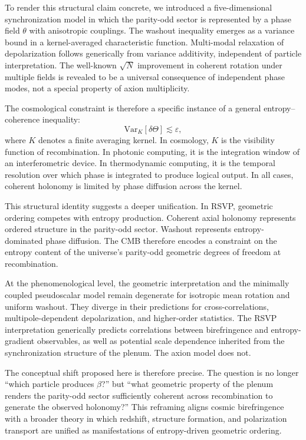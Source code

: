 \documentclass[12pt]{article}
\begin{document}
To render this structural claim concrete, we introduced a five-dimensional synchronization model in which the parity-odd sector is represented by a phase field $\theta$ with anisotropic couplings. The washout inequality emerges as a variance bound in a kernel-averaged characteristic function. Multi-modal relaxation of depolarization follows generically from variance additivity, independent of particle interpretation. The well-known $\sqrt{N}$ improvement in coherent rotation under multiple fields is revealed to be a universal consequence of independent phase modes, not a special property of axion multiplicity.

The cosmological constraint is therefore a specific instance of a general entropy--coherence inequality:
\begin{equation}
\mathrm{Var}_K[\delta\Theta] \lesssim \varepsilon,
\end{equation}
where $K$ denotes a finite averaging kernel. In cosmology, $K$ is the visibility function of recombination. In photonic computing, it is the integration window of an interferometric device. In thermodynamic computing, it is the temporal resolution over which phase is integrated to produce logical output. In all cases, coherent holonomy is limited by phase diffusion across the kernel.

This structural identity suggests a deeper unification. In RSVP, geometric ordering competes with entropy production. Coherent axial holonomy represents ordered structure in the parity-odd sector. Washout represents entropy-dominated phase diffusion. The CMB therefore encodes a constraint on the entropy content of the universe's parity-odd geometric degrees of freedom at recombination.

At the phenomenological level, the geometric interpretation and the minimally coupled pseudoscalar model remain degenerate for isotropic mean rotation and uniform washout. They diverge in their predictions for cross-correlations, multipole-dependent depolarization, and higher-order statistics. The RSVP interpretation generically predicts correlations between birefringence and entropy-gradient observables, as well as potential scale dependence inherited from the synchronization structure of the plenum. The axion model does not.

The conceptual shift proposed here is therefore precise. The question is no longer ``which particle produces $\beta$?'' but ``what geometric property of the plenum renders the parity-odd sector sufficiently coherent across recombination to generate the observed holonomy?'' This reframing aligns cosmic birefringence with a broader theory in which redshift, structure formation, and polarization transport are unified as manifestations of entropy-driven geometric ordering.
\end{document}
